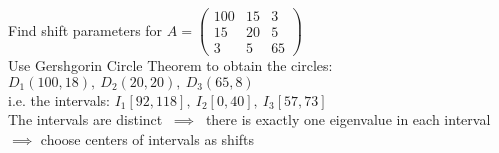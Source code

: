 \begin{SolutionSheet}[\ref{sheet3}]
\begin{onehalfspace}
  \begin{Solution} Find shift parameters for $A= \begin{pmatrix}
    100 & 15 & 3 \\
    15 & 20 & 5 \\
    3 & 5 & 65
  \end{pmatrix}$\\
  Use Gershgorin Circle Theorem to obtain the circles: \\
  $D_1(100,18), \ D_2(20,20), \ D_3(65,8) \quad$ \\
  i.e. the intervals: $I_1[92,118], \ I_2[0,40], \ I_3[57,73]$\\
  The intervals are distinct $ \ \implies \ $ there is exactly one eigenvalue in each interval \\
  $\implies$ choose centers of intervals as shifts 
  \end{Solution}

  \begin{Solution}[Programming]
  \end{Solution}

\end{onehalfspace}

\end{SolutionSheet}


